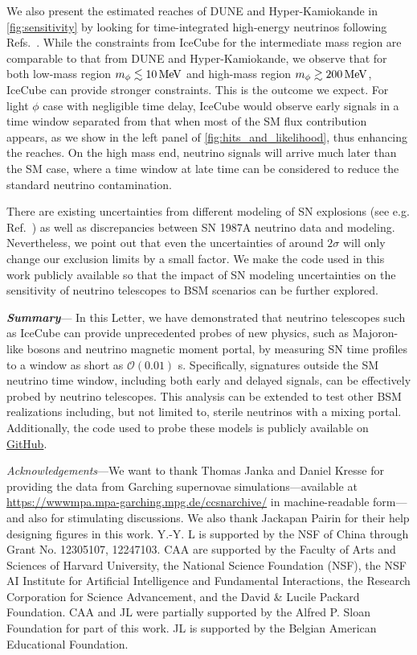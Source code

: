 \documentclass[aps,twocolumn,prl,showpacs,showkeys,preprintnumbers,superscriptaddress,nobibnotes,floatfix,longbibliography,notitlepage,nofootinbib]{revtex4-2}
\begin{document}
We also present the estimated reaches of DUNE and Hyper-Kamiokande in \cref{fig:sensitivity} by looking for time-integrated high-energy neutrinos following Refs.~\cite{Fiorillo:2022cdq, Brdar:2023tmi}.
While the constraints from IceCube for the intermediate mass region are comparable to that from DUNE and Hyper-Kamiokande, we observe that for both low-mass region $m_\phi \lesssim \unit[10]{MeV}$ and high-mass region $m_\phi \gtrsim \unit[200]{MeV}$, IceCube can provide stronger constraints.
This is the outcome we expect.
For light $\phi$ case with negligible time delay, IceCube would observe early signals in a time window separated from that when most of the SM flux contribution appears, as we show in the left panel of \cref{fig:hits_and_likelihood}, thus enhancing the reaches. On the high mass end, neutrino signals will arrive much later than the SM case, where a time window at late time can be considered to reduce the standard neutrino contamination. 

There are existing uncertainties from different modeling of SN explosions (see e.g. Ref.~\cite{li2023old}) as well as discrepancies between SN 1987A neutrino data and modeling. Nevertheless, we point out that even the uncertainties of around $2\sigma$  will only change our exclusion limits by a small factor.
We make the code used in this work publicly available so that the impact of SN modeling uncertainties on the sensitivity of neutrino telescopes to BSM scenarios can be further explored.

\textbf{\textit{Summary}}---
In this Letter, we have demonstrated that neutrino telescopes such as IceCube can provide unprecedented probes of new physics, such as Majoron-like bosons and neutrino magnetic moment portal, by measuring SN time profiles to a window as short as $\mathcal{O}(0.01)$ s. Specifically, signatures outside the SM neutrino time window, including both early and delayed signals, can be effectively probed by neutrino telescopes. This analysis can be extended to test other BSM realizations including, but not limited to, sterile neutrinos with a mixing portal.
Additionally, the code used to probe these models is publicly available on \href{https://github.com/jlazar17/NuTel_SNe_BSM/}{GitHub}.

\textit{Acknowledgements}---We want to thank Thomas Janka and Daniel Kresse for providing the data from Garching supernovae simulations---available at \url{https://wwwmpa.mpa-garching.mpg.de/ccsnarchive/} in machine-readable form---and also for stimulating discussions.
We also thank Jackapan Pairin for their help designing figures in this work.
Y.-Y. L is supported by the NSF of China through Grant No. 12305107, 12247103.
CAA are supported by the Faculty of Arts and Sciences of Harvard University, the National Science Foundation (NSF), the NSF AI Institute for Artificial Intelligence and Fundamental Interactions, the Research Corporation for Science Advancement, 
and the David \& Lucile Packard Foundation.
CAA and JL were partially supported by the Alfred P. Sloan Foundation for part of this work.
JL is supported by the Belgian American Educational Foundation.
\end{document}
